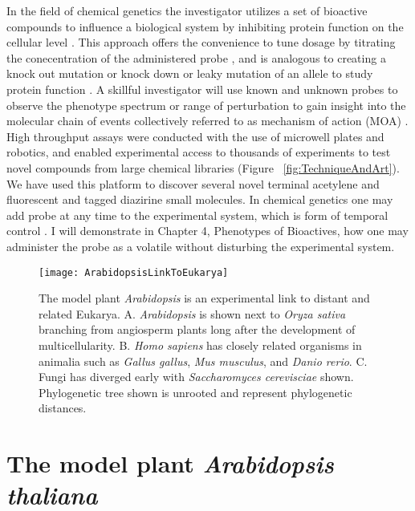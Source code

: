 In the field of chemical genetics the investigator utilizes a set of bioactive compounds to influence a biological system by inhibiting protein function on the cellular level \cite{chan2000chemical}. This approach offers the convenience to tune dosage by titrating the conecentration of the administered probe \cite{grozinger2001identification,zhao2003sir1}, and is analogous to creating a knock out mutation or knock down or leaky mutation of an allele to study protein function \cite{dai2005genetic}. A skillful investigator will use known and unknown probes to observe the phenotype spectrum or range of perturbation to gain insight into the molecular chain of events collectively referred to as mechanism of action (MOA) \cite{hayashi2003yokonolide, asami2003influence}. High throughput assays were conducted with the use of microwell plates and robotics, and enabled experimental access to thousands of experiments to test novel compounds from large chemical libraries (Figure ~\ref{fig:TechniqueAndArt}). We have used this platform to discover several novel terminal acetylene and fluorescent and tagged diazirine small molecules. In chemical genetics one may add probe at any time to the experimental system, which is form of temporal control \cite{raikhel2005adding}. I will demonstrate in Chapter 4, Phenotypes of Bioactives, how one may administer the probe as a volatile without disturbing the experimental system.


\begin{figure}
\texttt{[image: ArabidopsisLinkToEukarya]}
\caption{The model plant {\it Arabidopsis} is an experimental link to distant and related Eukarya. A. {\it Arabidopsis} is shown next to {\it Oryza sativa} branching from angiosperm plants long after the development of multicellularity. B. {\it Homo sapiens} has closely related organisms in animalia such as {\it Gallus gallus}, {\it Mus musculus}, and {\it Danio rerio}. C. Fungi has diverged early with {\it Saccharomyces cerevisciae} shown. Phylogenetic tree shown is unrooted and represent phylogenetic distances.}
\label{fig:ArabidopsisLinktoEukarya}
\end{figure}

\clearpage

\section{The model plant {\it Arabidopsis thaliana}}

